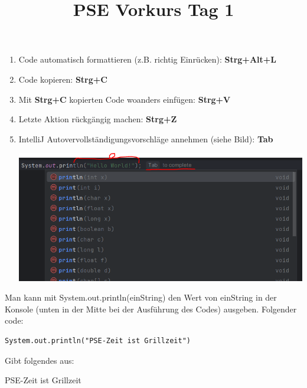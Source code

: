 \documentclass{../../sheet}
\title{PSE Vorkurs Tag 1}
\begin{document}
\maketitle

\begin{enumerate}
    \item Code automatisch formattieren (z.B. richtig Einrücken): \textbf{Strg+Alt+L}
    \item Code kopieren: \textbf{Strg+C}
    \item Mit \textbf{Strg+C} kopierten Code woanders einfügen: \textbf{Strg+V}
    \item Letzte Aktion rückgängig machen: \textbf{Strg+Z}
    \item IntelliJ Autovervollständigungsvorschläge annehmen (siehe Bild): \textbf{Tab}
    
    \begin{center}
        \includegraphics{img/AutocompleteIntelliJ.PNG}
    \end{center}
\end{enumerate}
\newpage


Man kann mit System.out.println(einString) den Wert von einString in der Konsole (unten in der Mitte bei der Ausführung des Codes) ausgeben. Folgender code:
\begin{verbatim}
System.out.println("PSE-Zeit ist Grillzeit")
\end{verbatim}
Gibt folgendes aus:
\begin{ausgabe}
    PSE-Zeit ist Grillzeit
\end{ausgabe}
\end{document}
